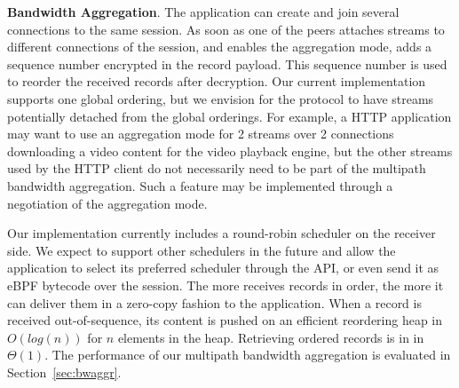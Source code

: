 \textbf{Bandwidth Aggregation}.
The application can create and join several \tcp connections to
the same \tcpls session. As soon as one of the peers attaches streams to
different \tcp connections of the session, and enables the aggregation mode,
\tcpls adds a sequence number encrypted in the \tls record payload. This
sequence number is used to reorder the received records after decryption. 
Our
current implementation supports one global ordering, but
we envision for the \tcpls protocol to have streams potentially detached from
the global orderings. For example, a HTTP application may want to use an
aggregation mode for 2 streams over 2 \tcp connections downloading a video
content for the video playback engine, but the other streams used by the HTTP
client do not necessarily need to be part of the multipath bandwidth aggregation.
Such a feature may be implemented through a negotiation of the aggregation
mode.

Our implementation currently includes a round-robin scheduler on the receiver
side. We expect to
support other schedulers in the future and allow the application to select its 
preferred scheduler through the API, or even send it as eBPF bytecode over the 
session. The more \tcpls receives records in order, the more it can deliver 
them in a zero-copy fashion to the application. When a record is received 
out-of-sequence, its content is pushed on an efficient reordering heap in 
$O(log(n))$ for $n$ elements in the heap. Retrieving ordered records is in
in $\Theta(1)$. The performance of our multipath bandwidth aggregation is evaluated 
in Section~\ref{sec:bwaggr}.


